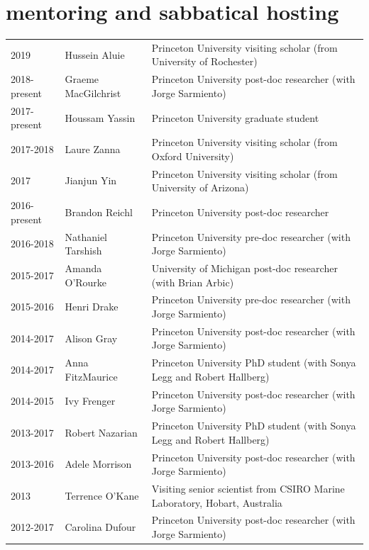 \documentclass{article}
\begin{document}
\section*{\sc  \color{Maroon} mentoring and sabbatical hosting}
\vspace{-.25cm}

\begin{tabular}{lll}
2019     & Hussein Aluie & Princeton University visiting scholar (from University of Rochester)  \\ 

2018-present & Graeme MacGilchrist & Princeton University post-doc researcher (with Jorge Sarmiento) \\ 
2017-present & Houssam Yassin & Princeton University graduate student \\ 
2017-2018 & Laure Zanna  & Princeton University visiting scholar (from Oxford University)  \\
2017 & Jianjun Yin       & Princeton University visiting scholar (from University of Arizona)  \\
2016-present & Brandon Reichl       & Princeton University post-doc researcher  \\
2016-2018 & Nathaniel Tarshish & Princeton University pre-doc researcher (with Jorge Sarmiento) \\
2015-2017 & Amanda O'Rourke  & University of Michigan post-doc researcher (with Brian Arbic) \\
2015-2016    & Henri Drake             & Princeton University pre-doc researcher (with Jorge Sarmiento) \\
2014-2017 & Alison Gray            & Princeton University post-doc researcher (with Jorge Sarmiento) \\
2014-2017 & Anna FitzMaurice   & Princeton University PhD student (with Sonya Legg and Robert Hallberg) \\ 
2014-2015     & Ivy Frenger            & Princeton University post-doc researcher (with Jorge Sarmiento) \\
2013-2017 & Robert Nazarian    & Princeton University PhD student (with Sonya Legg and Robert Hallberg) \\ 
2013-2016     & Adele Morrison     & Princeton University post-doc researcher (with Jorge Sarmiento) \\
2013               & Terrence O'Kane   & Visiting senior scientist from CSIRO Marine Laboratory, Hobart, Australia \\
2012-2017     & Carolina Dufour   & Princeton University post-doc researcher (with Jorge Sarmiento)  \\

\end{tabular}
\end{document}

